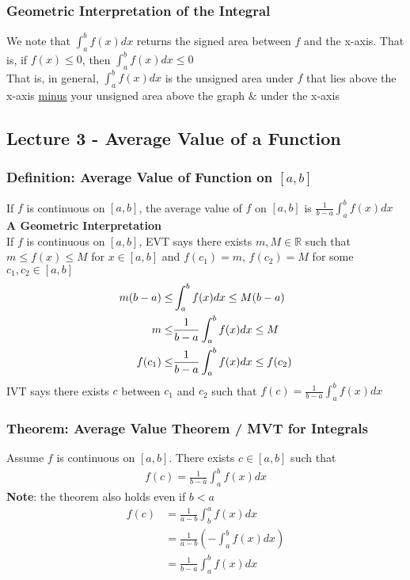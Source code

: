 \documentclass[12pt, letterpaper]{article}
\begin{document}
\subsubsection{Geometric Interpretation of the Integral}
We note that $\displaystyle\int_{a}^{b}f(x)dx$ returns the signed area between $f$ and the x-axis. That is,
if $f(x)\leq 0$, then $\displaystyle\int_{a}^{b}f(x)dx \leq 0$ \\
That is, in general, $\displaystyle\int_{a}^{b}f(x)dx$ is the unsigned area under $f$ that lies above the x-axis \underline{minus}
your unsigned area above the graph $\&$ under the x-axis
\subsection{Lecture 3 - Average Value of a Function}
\subsubsection{Definition: Average Value of Function on $[a,b]$}
If $f$ is continuous on $[a,b]$, the average value of $f$ on $[a,b]$ is $\frac{1}{b-a}\displaystyle\int_{a}^{b}f(x)dx$ \\
\textbf{A Geometric Interpretation} \\
If $f$ is continuous on $[a,b]$, EVT says there exists $m,M\in\mathbb{R}$ such that $m\leq f(x)\leq M$ for $x\in[a,b]$
and $f(c_1)=m$, $f(c_2)=M$ for some $c_1, c_2\in[a,b]$
\begin{align*}
    m(b-a) \leq \displaystyle&\int_{a}^{b}f(x)dx \leq M(b-a) \\
    m \leq &\frac{1}{b-a}\displaystyle\int_{a}^{b}f(x)dx \leq M \\
    f(c_1) \leq &\frac{1}{b-a}\displaystyle\int_{a}^{b}f(x)dx \leq f(c_2)
\end{align*}
IVT says there exists $c$ between $c_1$ and $c_2$ such that $f(c) = \frac{1}{b-a}\displaystyle\int_{a}^{b}f(x)dx$
\subsubsection{Theorem: Average Value Theorem / MVT for Integrals}
Assume $f$ is continuous on $[a,b]$. There exists $c\in[a,b]$ such that
\begin{align*}
    f(c) = \frac{1}{b-a}\displaystyle\int_{a}^{b}f(x)dx
\end{align*}
\textbf{Note}: the theorem also holds even if $b < a$
\begin{align*}
    f(c) &= \frac{1}{a-b}\displaystyle\int_{b}^{a}f(x)dx \\
         &= \frac{1}{a-b}(-\displaystyle\int_{a}^{b}f(x)dx) \\
         &= \frac{1}{b-a}\displaystyle\int_{a}^{b}f(x)dx
\end{align*}
\end{document}
